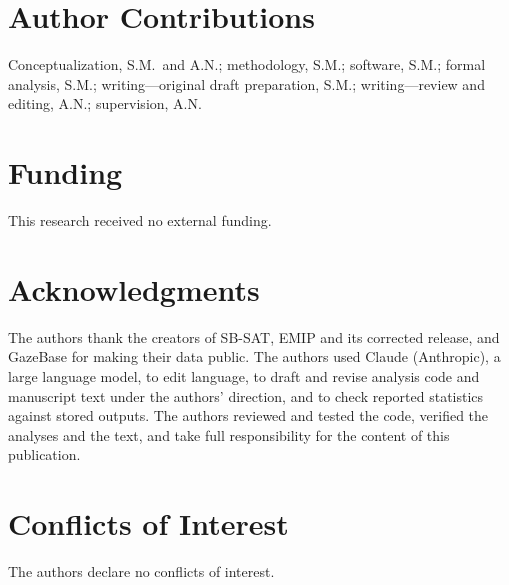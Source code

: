 \documentclass[11pt]{article}
\begin{document}
\section*{Author Contributions}
Conceptualization, S.M.\ and A.N.; methodology, S.M.; software, S.M.; formal analysis, S.M.; writing---original draft preparation, S.M.; writing---review and editing, A.N.; supervision, A.N.

\section*{Funding}
This research received no external funding.

\section*{Acknowledgments}
The authors thank the creators of SB-SAT, EMIP and its corrected release, and GazeBase for making their data public. The authors used Claude (Anthropic), a large language model, to edit language, to draft and revise analysis code and manuscript text under the authors' direction, and to check reported statistics against stored outputs. The authors reviewed and tested the code, verified the analyses and the text, and take full responsibility for the content of this publication.

\section*{Conflicts of Interest}
The authors declare no conflicts of interest.



\end{document}

